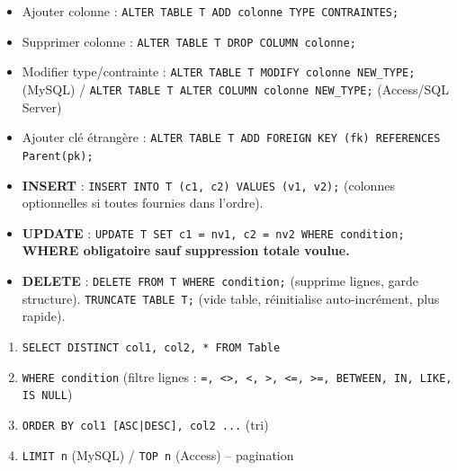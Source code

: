 \documentclass[11pt]{article}
\newcommand{\cle}[1]{{\popxbold\color{popdark}#1}}
\begin{document}
\begin{bilan}
\begin{methode}
\begin{itemize}
    \item Ajouter colonne : \texttt{ALTER TABLE T ADD colonne TYPE CONTRAINTES;}
    \item Supprimer colonne : \texttt{ALTER TABLE T DROP COLUMN colonne;}
    \item Modifier type/contrainte : \texttt{ALTER TABLE T MODIFY colonne NEW\_TYPE;} (MySQL) / \texttt{ALTER TABLE T ALTER COLUMN colonne NEW\_TYPE;} (Access/SQL Server)
    \item Ajouter clé étrangère : \texttt{ALTER TABLE T ADD FOREIGN KEY (fk) REFERENCES Parent(pk);}
\end{itemize}
\end{methode}

\begin{methode}
\begin{itemize}
    \item \textbf{INSERT} : \texttt{INSERT INTO T (c1, c2) VALUES (v1, v2);} (colonnes optionnelles si toutes fournies dans l'ordre).
    \item \textbf{UPDATE} : \texttt{UPDATE T SET c1 = nv1, c2 = nv2 WHERE condition;} \textbf{\cle{WHERE} obligatoire sauf suppression totale voulue.}
    \item \textbf{DELETE} : \texttt{DELETE FROM T WHERE condition;} (supprime lignes, garde structure). \texttt{TRUNCATE TABLE T;} (vide table, réinitialise auto-incrément, plus rapide).
\end{itemize}
\end{methode}

\begin{methode}
\begin{enumerate}
    \item \texttt{SELECT \cle{DISTINCT} col1, col2, * FROM Table}
    \item \texttt{WHERE condition} (filtre lignes : \texttt{=, <>, <, >, <=, >=, BETWEEN, IN, LIKE, IS NULL})
    \item \texttt{ORDER BY col1 [ASC|DESC], col2 ...} (tri)
    \item \texttt{LIMIT n} (MySQL) / \texttt{TOP n} (Access) -- pagination
\end{enumerate}
\end{methode}


\end{bilan}
\end{document}
